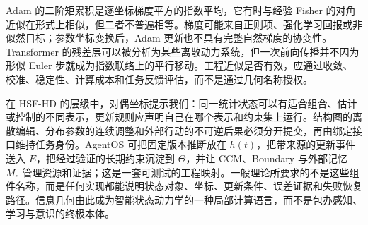 Adam 的二阶矩累积是逐坐标梯度平方的指数平均，它有时与经验 Fisher 的对角近似在形式上相似，但二者不普遍相等。梯度可能来自正则项、强化学习回报或非似然目标；参数坐标变换后，Adam 更新也不具有完整自然梯度的协变性。Transformer 的残差层可以被分析为某些离散动力系统，但一次前向传播并不因为形似 Euler 步就成为指数联络上的平行移动。工程近似是否有效，应通过收敛、校准、稳定性、计算成本和任务反馈评估，而不是通过几何名称授权。

在 HSF-HD 的层级中，对偶坐标提示我们：同一统计状态可以有适合组合、估计或控制的不同表示，更新规则应声明自己在哪个表示和约束集上运行。结构图的离散编辑、分布参数的连续调整和外部行动的不可逆后果必须分开提交，再由绑定接口维持任务身份。AgentOS 可把固定版本推断放在 $h(t)$，把带来源的更新事件送入 $E$，把经过验证的长期约束沉淀到 $\Theta$，并让 CCM、Boundary 与外部记忆 $M_e$ 管理资源和证据；这是一套可测试的工程映射。一般理论所要求的不是这些组件名称，而是任何实现都能说明状态对象、坐标、更新条件、误差证据和失败恢复路径。信息几何由此成为智能状态动力学的一种局部计算语言，而不是包办感知、学习与意识的终极本体。

